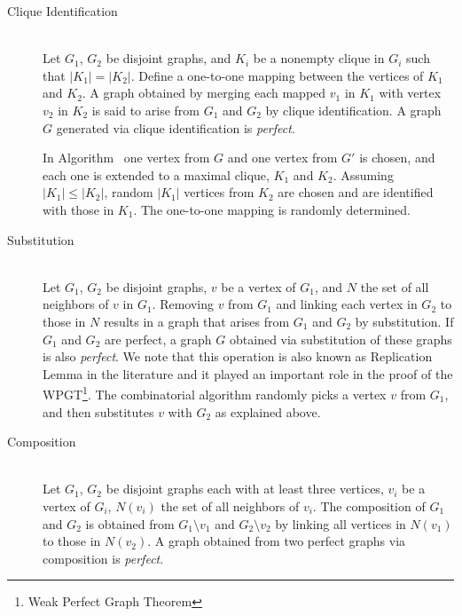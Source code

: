 \begin{description}
    \item[Clique Identification] \hfill \\
    Let $G_1$, $G_2$ be disjoint graphs, and $K_i$ be a nonempty clique in $G_i$ such that $|K_1| = |K_2|$. Define a one-to-one mapping between the vertices of $K_1$ and $K_2$. A graph obtained by merging each mapped $v_1$ in $K_1$ with vertex $v_2$ in $K_2$ is said to arise from $G_1$ and $G_2$ by clique identification. A graph $G$ generated via clique identification is \textit{perfect}.

    In Algorithm \PerfectGen\, one vertex from $G$ and one vertex from $G'$ is chosen, and each one is extended to a maximal clique, $K_1$ and $K_2$. Assuming $|K_1| \leq |K_2|$, random $|K_1|$ vertices from $K_2$ are chosen and are identified with those in $K_1$. The one-to-one mapping is randomly determined.

    
    
    \item[Substitution] \hfill \\
    Let $G_1$, $G_2$ be disjoint graphs, $v$ be a vertex of $G_1$, and $N$ the set of all neighbors of $v$ in $G_1$. Removing $v$ from $G_1$ and linking each vertex in $G_2$ to those in $N$ results in a graph that arises from $G_1$ and $G_2$ by substitution. If $G_1$ and $G_2$ are perfect, a graph $G$ obtained via substitution of these graphs is also \textit{perfect}. We note that this operation is also known as Replication Lemma in the literature and it played an important role in the proof of the WPGT\footnote{Weak Perfect Graph Theorem}. The combinatorial algorithm randomly picks a vertex $v$ from $G_1$, and then substitutes $v$ with $G_2$ as explained above.

    

    \item[Composition] \hfill \\
    Let $G_1$, $G_2$ be disjoint graphs each with at least three vertices, $v_i$ be a vertex of $G_i$, $N(v_i)$ the set of all neighbors of $v_i$. The composition of $G_1$ and $G_2$ is obtained from $G_1 \setminus {v_1}$ and $G_2 \setminus {v_2}$ by linking all vertices in $N(v_1)$ to those in $N(v_2)$. A graph obtained from two perfect graphs via composition is \textit{perfect}.

    
    

\end{description}
